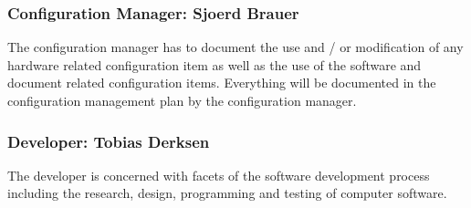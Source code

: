     \subsubsection{Configuration Manager: Sjoerd Brauer}
    The configuration manager has to document
    the use and / or modification of any hardware related configuration item as well as the use of the
    software and document related configuration items. Everything will be documented in the configuration management plan
    by the configuration manager.

    \subsubsection{Developer: Tobias Derksen}
    The developer is concerned with facets of the software development process including the research, design, programming
    and testing of computer software.
